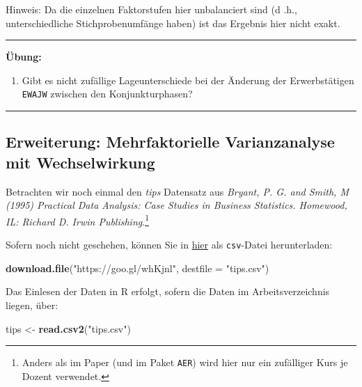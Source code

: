 \documentclass[12pt,ngerman,paper=a4,pagesize,DIV=13]{scrreprt}
\newenvironment{Shaded}{\begin{snugshade}}{\end{snugshade}}
\newcommand{\DataTypeTok}[1]{\textcolor[rgb]{0.13,0.29,0.53}{#1}}
\newcommand{\KeywordTok}[1]{\textcolor[rgb]{0.13,0.29,0.53}{\textbf{#1}}}
\newcommand{\NormalTok}[1]{#1}
\newcommand{\StringTok}[1]{\textcolor[rgb]{0.31,0.60,0.02}{#1}}
\providecommand{\tightlist}{%
  \setlength{\itemsep}{0pt}\setlength{\parskip}{0pt}}
\begin{document}
Hinweis: Da die einzelnen Faktorstufen hier unbalanciert sind (d .h.,
unterschiedliche Stichprobenumfänge haben) ist das Ergebnis hier nicht
exakt.

\begin{center}\rule{0.5\linewidth}{\linethickness}\end{center}

\textbf{Übung:}

\begin{enumerate}
\def\labelenumi{\arabic{enumi}.}
\setcounter{enumi}{2}
\tightlist
\item
  Gibt es nicht zufällige Lageunterschiede bei der Änderung der
  Erwerbstätigen \texttt{EWAJW} zwischen den Konjunkturphasen?
\end{enumerate}

\begin{center}\rule{0.5\linewidth}{\linethickness}\end{center}

\hypertarget{erweiterung-mehrfaktorielle-varianzanalyse-mit-wechselwirkung}{%
\subsection{Erweiterung: Mehrfaktorielle Varianzanalyse mit
Wechselwirkung}\label{erweiterung-mehrfaktorielle-varianzanalyse-mit-wechselwirkung}}

Betrachten wir noch einmal den \emph{tips} Datensatz aus \emph{Bryant,
P. G. and Smith, M (1995) Practical Data Analysis: Case Studies in
Business Statistics. Homewood, IL: Richard D. Irwin
Publishing}.\footnote{Anders als im Paper (und im Paket \texttt{AER})
  wird hier nur ein zufälliger Kurs je Dozent verwendet.}

Sofern noch nicht geschehen, können Sie in
\href{https://goo.gl/whKjnl}{hier} als \texttt{csv}-Datei herunterladen:

\begin{Shaded}
\begin{Highlighting}[]
\KeywordTok{download.file}\NormalTok{(}\StringTok{"https://goo.gl/whKjnl"}\NormalTok{, }\DataTypeTok{destfile =} \StringTok{"tips.csv"}\NormalTok{)}
\end{Highlighting}
\end{Shaded}

Das Einlesen der Daten in R erfolgt, sofern die Daten im
Arbeitsverzeichnis liegen, über:

\begin{Shaded}
\begin{Highlighting}[]
\NormalTok{tips <-}\StringTok{ }\KeywordTok{read.csv2}\NormalTok{(}\StringTok{"tips.csv"}\NormalTok{)}
\end{Highlighting}
\end{Shaded}
\end{document}
